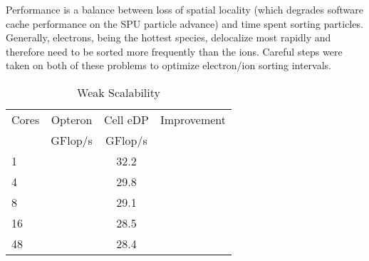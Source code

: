 \documentclass[10pt]{article}
\begin{document}
Performance is a balance between loss of spatial locality (which
degrades software cache performance on the SPU particle advance) and
time spent sorting particles.  Generally, electrons, being the hottest
species, delocalize most rapidly and therefore need to be sorted more
frequently than the ions.  Careful steps were taken on both of these
problems to optimize electron/ion sorting intervals.

\begin{table}
\caption{\label{tbl:ASDS_Weak_Scalability}
Weak Scalability}

\begin{center}
\begin{tabular}{l c c c}
\hline
\hline
Cores & Opteron & Cell eDP & Improvement\\
 & GFlop/s & GFlop/s & \\
\hline
1 & & 32.2 & \\
4 & & 29.8 & \\
8 & & 29.1 & \\
16 & & 28.5 & \\
48 & & 28.4 & \\
\hline
\end{tabular}
\end{center}
\end{table}

%
%
%
%
%

\end{document}
